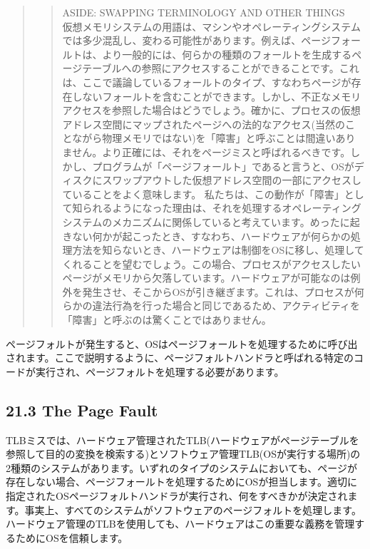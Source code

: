 \begin{quote}
\begin{quote}
ASIDE: SWAPPING TERMINOLOGY AND OTHER THINGS\\
仮想メモリシステムの用語は、マシンやオペレーティングシステムでは多少混乱し、変わる可能性があります。例えば、ページフォールトは、より一般的には、何らかの種類のフォールトを生成するページテーブルへの参照にアクセスすることができることです。これは、ここで議論しているフォールトのタイプ、すなわちページが存在しないフォールトを含むことができます。しかし、不正なメモリアクセスを参照した場合はどうでしょう。確かに、プロセスの仮想アドレス空間にマップされたページへの法的なアクセス(当然のことながら物理メモリではない)を「障害」と呼ぶことは間違いありません。より正確には、それをページミスと呼ばれるべきです。しかし、プログラムが「ページフォールト」であると言うと、OSがディスクにスワップアウトした仮想アドレス空間の一部にアクセスしていることをよく意味します。
私たちは、この動作が「障害」として知られるようになった理由は、それを処理するオペレーティングシステムのメカニズムに関係していると考えています。めったに起きない何かが起こったとき、すなわち、ハードウェアが何らかの処理方法を知らないとき、ハードウェアは制御をOSに移し、処理してくれることを望むでしょう。この場合、プロセスがアクセスしたいページがメモリから欠落しています。ハードウェアが可能なのは例外を発生させ、そこからOSが引き継ぎます。これは、プロセスが何らかの違法行為を行った場合と同じであるため、アクティビティを「障害」と呼ぶのは驚くことではありません。
\end{quote}
\end{quote}

ページフォルトが発生すると、OSはページフォールトを処理するために呼び出されます。ここで説明するように、ページフォルトハンドラと呼ばれる特定のコードが実行され、ページフォルトを処理する必要があります。

\hypertarget{the-page-fault}{%
\subsection*{21.3 The Page Fault}\label{the-page-fault}}

TLBミスでは、ハードウェア管理されたTLB(ハードウェアがページテーブルを参照して目的の変換を検索する)とソフトウェア管理TLB(OSが実行する場所)の2種類のシステムがあります。いずれのタイプのシステムにおいても、ページが存在しない場合、ページフォールトを処理するためにOSが担当します。適切に指定されたOSページフォルトハンドラが実行され、何をすべきかが決定されます。事実上、すべてのシステムがソフトウェアのページフォルトを処理します。ハードウェア管理のTLBを使用しても、ハードウェアはこの重要な義務を管理するためにOSを信頼します。

